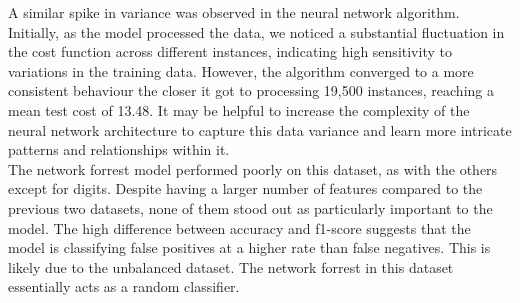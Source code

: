 \documentclass{article}
\begin{document}
A similar spike in variance was observed in the neural network algorithm. 
Initially, as the model processed the data, 
we noticed a substantial fluctuation in the cost function across different instances, 
indicating high sensitivity to variations in the training data. 
However, the algorithm converged to a more consistent behaviour the closer it got to processing 19,500 instances,
reaching a mean test cost of 13.48.
It may be helpful to increase the complexity of the neural network architecture to capture this data variance
and learn more intricate patterns and relationships within it.
\\

The network forrest model performed poorly on this dataset, as with the others except for digits. Despite having a larger number of 
features compared to the previous two datasets, none of them stood out as particularly important to the model. The high difference between accuracy
and f1-score suggests that the model is classifying false positives at a higher rate than false negatives. This is likely due to the unbalanced dataset. The network forrest in this dataset
essentially acts as a random classifier.
\end{document}

